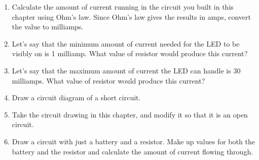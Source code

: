 \begin{enumerate}
\item Calculate the amount of current running in the circuit you built in this chapter using Ohm's law.  Since Ohm's law gives the results in amps, convert the value to milliamps.
\item Let's say that the minimum amount of current needed for the LED to be visibly on is 1 milliamp.  What value of resistor would produce this current?
\item Let's say that the maximum amount of current the LED can handle is 30 milliamps.  What value of resistor would produce this current?
\item Draw a circuit diagram of a short circuit.
\item Take the circuit drawing in this chapter, and modify it so that it is an open circuit.
\item Draw a circuit with just a battery and a resistor.  Make up values for both the battery and the resistor and calculate the amount of current flowing through.
\end{enumerate}
